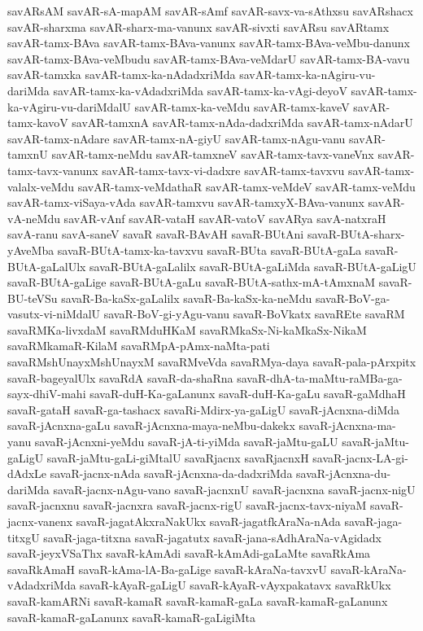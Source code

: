 {savARsAM
savAR-sA-mapAM
savAR-sAmf
savAR-savx-va-sAthxsu
savARshacx
savAR-sharxma
savAR-sharx-ma-vanunx
savAR-sivxti
savARsu
savARtamx
savAR-tamx-BAva
savAR-tamx-BAva-vanunx
savAR-tamx-BAva-veMbu-danunx
savAR-tamx-BAva-veMbudu
savAR-tamx-BAva-veMdarU
savAR-tamx-BA-vavu
savAR-tamxka
savAR-tamx-ka-nAdadxriMda
savAR-tamx-ka-nAgiru-vu-dariMda
savAR-tamx-ka-vAdadxriMda
savAR-tamx-ka-vAgi-deyoV
savAR-tamx-ka-vAgiru-vu-dariMdalU
savAR-tamx-ka-veMdu
savAR-tamx-kaveV
savAR-tamx-kavoV
savAR-tamxnA
savAR-tamx-nAda-dadxriMda
savAR-tamx-nAdarU
savAR-tamx-nAdare
savAR-tamx-nA-giyU
savAR-tamx-nAgu-vanu
savAR-tamxnU
savAR-tamx-neMdu
savAR-tamxneV
savAR-tamx-tavx-vaneVnx
savAR-tamx-tavx-vanunx
savAR-tamx-tavx-vi-dadxre
savAR-tamx-tavxvu
savAR-tamx-valalx-veMdu
savAR-tamx-veMdathaR
savAR-tamx-veMdeV
savAR-tamx-veMdu
savAR-tamx-viSaya-vAda
savAR-tamxvu
savAR-tamxyX-BAva-vanunx
savAR-vA-neMdu
savAR-vAnf
savAR-vataH
savAR-vatoV
savARya
savA-natxraH
savA-ranu
savA-saneV
savaR
savaR-BAvAH
savaR-BUtAni
savaR-BUtA-sharx-yAveMba
savaR-BUtA-tamx-ka-tavxvu
savaR-BUta
savaR-BUtA-gaLa
savaR-BUtA-gaLalUlx
savaR-BUtA-gaLalilx
savaR-BUtA-gaLiMda
savaR-BUtA-gaLigU
savaR-BUtA-gaLige
savaR-BUtA-gaLu
savaR-BUtA-sathx-mA-tAmxnaM
savaR-BU-teVSu
savaR-Ba-kaSx-gaLalilx
savaR-Ba-kaSx-ka-neMdu
savaR-BoV-ga-vasutx-vi-niMdalU
savaR-BoV-gi-yAgu-vanu
savaR-BoVkatx
savaREte
savaRM
savaRMKa-livxdaM
savaRMduHKaM
savaRMkaSx-Ni-kaMkaSx-NikaM
savaRMkamaR-KilaM
savaRMpA-pAmx-naMta-pati
savaRMshUnayxMshUnayxM
savaRMveVda
savaRMya-daya
savaR-pala-pArxpitx
savaR-bageyalUlx
savaRdA
savaR-da-shaRna
savaR-dhA-ta-maMtu-raMBa-ga-sayx-dhiV-mahi
savaR-duH-Ka-gaLanunx
savaR-duH-Ka-gaLu
savaR-gaMdhaH
savaR-gataH
savaR-ga-tashacx
savaRi-Mdirx-ya-gaLigU
savaR-jAcnxna-diMda
savaR-jAcnxna-gaLu
savaR-jAcnxna-maya-neMbu-dakekx
savaR-jAcnxna-ma-yanu
savaR-jAcnxni-yeMdu
savaR-jA-ti-yiMda
savaR-jaMtu-gaLU
savaR-jaMtu-gaLigU
savaR-jaMtu-gaLi-giMtalU
savaRjacnx
savaRjacnxH
savaR-jacnx-LA-gi-dAdxLe
savaR-jacnx-nAda
savaR-jAcnxna-da-dadxriMda
savaR-jAcnxna-du-dariMda
savaR-jacnx-nAgu-vano
savaR-jacnxnU
savaR-jacnxna
savaR-jacnx-nigU
savaR-jacnxnu
savaR-jacnxra
savaR-jacnx-rigU
savaR-jacnx-tavx-niyaM
savaR-jacnx-vanenx
savaR-jagatAkxraNakUkx
savaR-jagatfkAraNa-nAda
savaR-jaga-titxgU
savaR-jaga-titxna
savaR-jagatutx
savaR-jana-sAdhAraNa-vAgidadx
savaR-jeyxVSaThx
savaR-kAmAdi
savaR-kAmAdi-gaLaMte
savaRkAma
savaRkAmaH
savaR-kAma-lA-Ba-gaLige
savaR-kAraNa-tavxvU
savaR-kAraNa-vAdadxriMda
savaR-kAyaR-gaLigU
savaR-kAyaR-vAyxpakatavx
savaRkUkx
savaR-kamARNi
savaR-kamaR
savaR-kamaR-gaLa
savaR-kamaR-gaLanunx
savaR-kamaR-gaLanunx
savaR-kamaR-gaLigiMta
}
